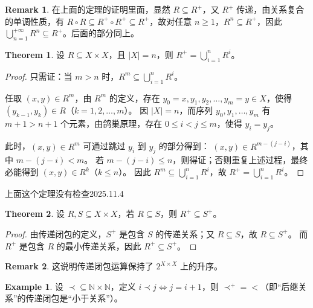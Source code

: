 \documentclass[oneside]{book}
\theoremstyle{definition}
\newtheorem{example}{Example}[section]
\newtheorem{theorem}{Theorem}[section]
\newtheorem{remark}{Remark}[section]
\begin{document}
	\begin{remark}
在上面的定理的证明里面，显然 \( R \subseteq R^+ \)，又 \( R^+ \) 传递，由关系复合的单调性质，有 \( R\circ R\subseteq R^+\circ R^+\subseteq R^+\)，故对任意 \( n \geq 1 \)，\( R^n \subseteq R^+ \)，因此 \( \bigcup_{n=1}^{+\infty} R^n \subseteq R^+ \)。后面的部分同上。
	\end{remark}


\begin{theorem}
	设 \( R \subseteq X \times X \)，且 \( |X| = n \)，则 \( R^+ = \bigcup_{i=1}^n R^i \)。
\end{theorem}
\begin{proof}
	只需证：当 \( m > n \) 时，\( R^m \subseteq \bigcup_{i=1}^n R^i \)。
	
	任取 \( (x, y) \in R^m \)，由 \( R^m \) 的定义，存在 \( y_0=x, y_1, y_2, \dots, y_m=y \in X \)，使得 \( (y_{k-1}, y_k) \in R \)（\( k=1,2,\dots,m \)）。
	因 \( |X| = n \)，而序列 \( y_0, y_1, \dots, y_m \) 有 \( m+1 > n+1 \) 个元素，由鸽巢原理，存在 \( 0 \leq i < j \leq m \)，使得 \( y_i = y_j \)。
	
	此时，\( (x, y) \in R^m \) 可通过跳过 \( y_i \) 到 \( y_j \) 的部分得到：
	\( (x, y) \in R^{m - (j - i)} \)，其中 \( m - (j - i) < m \)。
	若 \( m - (j - i) \leq n \)，则得证；否则重复上述过程，最终必能得到 \( (x, y) \in R^k \)（\( k \leq n \)）。
	因此 \( R^m \subseteq \bigcup_{i=1}^n R^i \)，故 \( R^+ = \bigcup_{i=1}^n R^i \)。
\end{proof}
上面这个定理没有检查2025.11.4


\begin{theorem}
	设 \( R, S \subseteq X \times X \)，若 \( R \subseteq S \)，则 \( R^+ \subseteq S^+ \)。
\end{theorem}

\begin{proof}
	由传递闭包的定义，\( S^+ \) 是包含 \( S \) 的传递关系；又 \( R \subseteq S \)，故 \( R \subseteq S^+ \)。
	而 \( R^+ \) 是包含 \( R \) 的最小传递关系，因此 \( R^+ \subseteq S^+ \)。
\end{proof}
\begin{remark}
	这说明传递闭包运算保持了 \(2^{X\times X}\) 上的升序。
\end{remark}

\begin{example}
	设 \( \prec \subseteq \mathbb{N} \times \mathbb{N} \)，定义 \( i \prec j \iff j = i+1 \)，则 \( \prec^+ = < \)（即“后继关系”的传递闭包是“小于关系”）。
\end{example}
\end{document}

